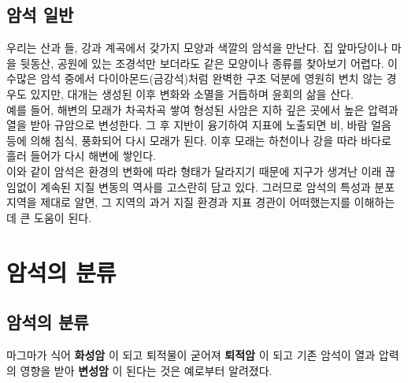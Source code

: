 \documentclass[12pt, a4paper, twoside]{book}
\begin{document}
	\clearpage
	\section{암석 일반}
	

				우리는 산과 들, 강과 계곡에서 갖가지 모양과 색깔의 암석을 만난다. 
				집 앞마당이나 마을 뒷동산, 공원에 있는 조경석만 보더라도 같은 모양이나 종류를 찾아보기 어렵다. 
				이 수많은 암석 중에서 다이아몬드(금강석)처럼 완벽한 구조 덕분에 영원히 변치 않는 경우도 있지만, 대개는 생성된 이후 변화와 소멸을 거듭하며 윤회의 삶을 산다.  \\
				

				예를 들어, 해변의 모래가 차곡차곡 쌓여 형성된 사암은 지하 깊은 곳에서 높은 압력과 열을 받아 규암으로 변성한다. 
				그 후 지반이 융기하여 지표에 노출되면 비, 바람 얼음 등에 의해 침식, 풍화되어 다시 모래가 된다. 
				이후 모래는 하천이나 강을 따라 바다로 흘러 들어가 다시 해변에 쌓인다. \\

				이와 같이 암석은 환경의 변화에 따라 형태가 달라지기 때문에 지구가 생겨난 이래 끊임없이 계속된 지질 변동의 역사를 고스란히 담고 있다. 
				그러므로 암석의 특성과 분포 지역을 제대로 알면, 그 지역의 과거 지질 환경과 지표 경관이 어떠했는지를 이해하는데 큰 도움이 된다.




	\clearpage
	\chapter{암석의 분류}
	\minitoc				%


	\clearpage
	\section{	암석의 분류}
	
			마그마가 식어 \textbf{ 화성암 }이 되고 퇴적물이 굳어져 \textbf{ 퇴적암 }이 되고 
			기존 암석이 열과 압력의 영향을 받아 \textbf{ 변성암 }이 된다는 것은 예로부터 알려졌다.
			
			
			\setlength{\fboxsep}{10pt}
			\setlength{\fboxrule}{2pt}
			\begin{center}
			 \hfill
			 \hfill
			\end{center}
			
\end{document}
